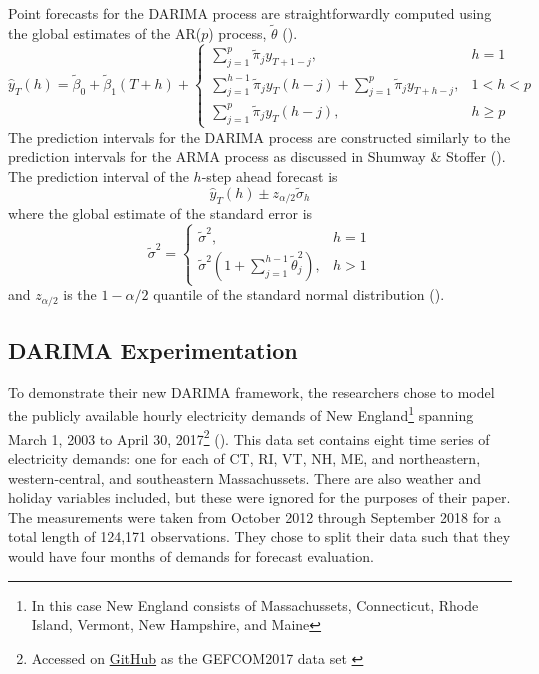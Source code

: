 \documentclass[
]{article}
\begin{document}
Point forecasts for the DARIMA process are straightforwardly computed using the global estimates of the AR($p$) process, $\tilde{\theta}$ (\cite[p.~19-20]{wang_distributed_2020}). 
\[\hat{y}_T(h) = \tilde{\beta}_0 + \tilde{\beta}_1 (T + h) +
 \begin{cases}
\sum_{j = 1}^p \tilde{\pi}_j y_{T + 1 - j}, & h = 1 \\
\sum_{j = 1}^{h - 1} \tilde{\pi}_j y_{T}(h-j) + \sum_{j = 1}^p \tilde{\pi}_j y_{T + h - j}, & 1 < h < p \\
\sum_{j = 1}^{p} \tilde{\pi}_j y_{T}(h-j), & h \geq p 
\end{cases}\]
The prediction intervals for the DARIMA process are constructed similarly to the prediction intervals for the ARMA process as discussed in Shumway \& Stoffer (\cite*[p.~93-94]{shumway_time_2019}). The prediction interval of the $h$-step ahead forecast is 
\[\hat{y}_T(h) \pm z_{\alpha/2} \tilde{\sigma}_h\]
where the global estimate of the standard error is
\[\tilde{\sigma}^2 = \begin{cases}
  \tilde{\sigma}^2, & h = 1 \\
  \tilde{\sigma}^2(1 + \sum_{j = 1}^{h - 1}\tilde{\theta}_j^2), & h > 1
\end{cases}\]
and $z_{\alpha/2}$ is the $1 - \alpha/2$ quantile of the standard normal distribution (\cite[p.~20-21]{wang_distributed_2020}).


\subsection*{DARIMA Experimentation}

To demonstrate their new DARIMA framework, the researchers chose to model the publicly available hourly electricity demands of New England\footnote{In this case New England consists of Massachussets, Connecticut, Rhode Island, Vermont, New Hampshire, and Maine} spanning March 1, 2003 to April 30, 2017\footnote{Accessed on \href{https://github.com/camroach87/gefcom2017data}{GitHub} as the GEFCOM2017 data set \cite{roach_camroach87gefcom2017data_2020}} (\cite[p.~21]{wang_distributed_2020}). This data set contains eight time series of electricity demands: one for each of CT, RI, VT, NH, ME, and northeastern, western-central, and southeastern Massachussets. There are also weather and holiday variables included, but these were ignored for the purposes of their paper. The measurements were taken from October 2012 through September 2018 for a total length of 124,171 observations. They chose to split their data such that they would have four months of demands for forecast evaluation. 
\end{document}
